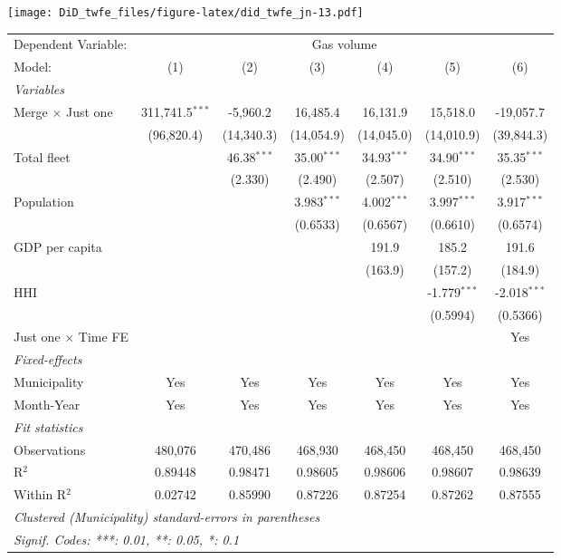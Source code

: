 \documentclass[
]{article}
\begin{document}
\texttt{[image: DiD\_twfe\_files/figure-latex/did\_twfe\_jn-13.pdf]}

\begin{tabular}{lcccccc}
\tabularnewline\midrule\midrule
Dependent Variable:&\multicolumn{6}{c}{Gas volume}\\
Model:&(1) & (2) & (3) & (4) & (5) & (6)\\
\midrule \emph{Variables}&   &   &   &   &   &  \\
Merge $\times $ Just one & 311,741.5$^{***}$ & -5,960.2 & 16,485.4 & 16,131.9 & 15,518.0 & -19,057.7\\
  &(96,820.4) & (14,340.3) & (14,054.9) & (14,045.0) & (14,010.9) & (39,844.3)\\
Total fleet &    & 46.38$^{***}$ & 35.00$^{***}$ & 34.93$^{***}$ & 34.90$^{***}$ & 35.35$^{***}$\\
  &   & (2.330) & (2.490) & (2.507) & (2.510) & (2.530)\\
Population &    &    & 3.983$^{***}$ & 4.002$^{***}$ & 3.997$^{***}$ & 3.917$^{***}$\\
  &   &    & (0.6533) & (0.6567) & (0.6610) & (0.6574)\\
GDP per capita &    &    &    & 191.9 & 185.2 & 191.6\\
  &   &    &    & (163.9) & (157.2) & (184.9)\\
HHI &    &    &    &    & -1.779$^{***}$ & -2.018$^{***}$\\
  &   &    &    &    & (0.5994) & (0.5366)\\
Just one $\times$ Time FE &  &  &  &  &  & Yes\\
\midrule \emph{Fixed-effects}&   &   &   &   &   &  \\
Municipality & Yes & Yes & Yes & Yes & Yes & Yes\\
Month-Year & Yes & Yes & Yes & Yes & Yes & Yes\\
\midrule \emph{Fit statistics}&  & & & & & \\
Observations & 480,076&470,486&468,930&468,450&468,450&468,450\\
R$^2$ & 0.89448&0.98471&0.98605&0.98606&0.98607&0.98639\\
Within R$^2$ & 0.02742&0.85990&0.87226&0.87254&0.87262&0.87555\\
\midrule\midrule\multicolumn{7}{l}{\emph{Clustered (Municipality) standard-errors in parentheses}}\\
\multicolumn{7}{l}{\emph{Signif. Codes: ***: 0.01, **: 0.05, *: 0.1}}\\
\end{tabular}
\end{document}
